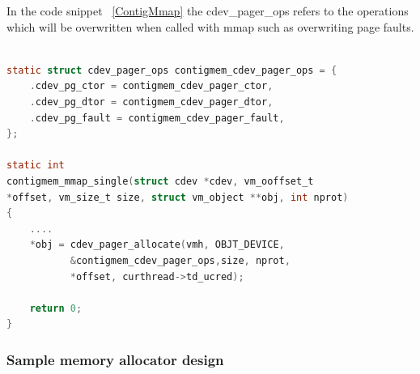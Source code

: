 In the code snippet ~\ref{ContigMmap} the cdev\_pager\_ops refers to the operations which will be overwritten 
when called with mmap such as overwriting page faults.


\begin{lstlisting}[language=C, caption=Contigmem driver mmap , label=ContigMmap]

static struct cdev_pager_ops contigmem_cdev_pager_ops = {
	.cdev_pg_ctor = contigmem_cdev_pager_ctor,
	.cdev_pg_dtor = contigmem_cdev_pager_dtor,
	.cdev_pg_fault = contigmem_cdev_pager_fault,
};

static int
contigmem_mmap_single(struct cdev *cdev, vm_ooffset_t 
*offset, vm_size_t size, struct vm_object **obj, int nprot)
{
    ....
	*obj = cdev_pager_allocate(vmh, OBJT_DEVICE, 
           &contigmem_cdev_pager_ops,size, nprot, 
           *offset, curthread->td_ucred);

	return 0;
}
\end{lstlisting}



\subsubsection{Sample memory allocator design}

